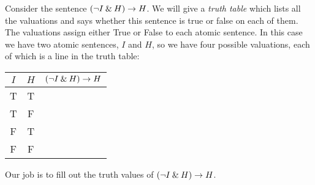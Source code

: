 

Consider the sentence $(\neg I\mathbin{\&} H)\rightarrow H$. We will give a \emph{truth table} which lists all the valuations and says whether this sentence is true or false on each of them.
The valuations assign either True or False to each atomic sentence. In this case we have two atomic sentences, $I$ and $H$, so we have four possible valuations, each of which is a line in the truth table:
\begin{center}
\begin{tabular}{cc|c}
$I$&$H$&$(\neg I\mathbin{\&} H)\rightarrow H$\\\hline
T&T&\\
T&F&\\
F&T&\\
F&F&
\end{tabular}
\end{center}
Our job is to fill out the truth values of $(\neg I\mathbin{\&} H)\rightarrow H$.

